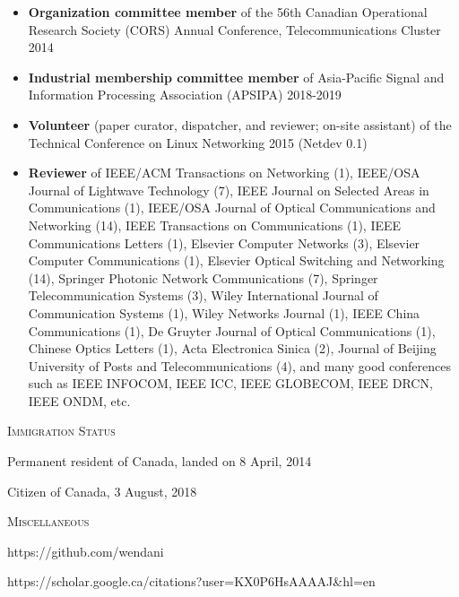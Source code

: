 \documentclass[letterpaper,11pt]{article}
\newcommand{\resheading}[1]{{\noindent\large \colorbox{mygrey}{
\begin{minipage}{1.0\textwidth}{\textsc{#1 \vphantom{p\^{E}}}}\end{minipage}}}}
\begin{document}
\begin{itemize}
\item
\textbf{Organization committee member} of the 56th Canadian Operational Research Society (CORS) Annual Conference, Telecommunications Cluster 2014

\item
\textbf{Industrial membership committee member} of Asia-Pacific Signal and Information Processing Association (APSIPA) 2018-2019

\item
\textbf{Volunteer} (paper curator, dispatcher, and reviewer; on-site assistant) of the Technical Conference on Linux Networking 2015 (Netdev 0.1)

\item
\textbf{Reviewer} of IEEE/ACM Transactions on Networking (1), IEEE/OSA Journal of Lightwave Technology (7), IEEE Journal on Selected Areas in Communications (1),
IEEE/OSA Journal of Optical Communications and Networking (14), IEEE Transactions on Communications (1), IEEE Communications Letters (1),
Elsevier Computer Networks (3), Elsevier Computer Communications (1), Elsevier Optical Switching and Networking (14),
Springer Photonic Network Communications (7), Springer Telecommunication Systems (3), Wiley International Journal of Communication Systems (1),
Wiley Networks Journal (1), IEEE China Communications (1), De Gruyter Journal of Optical Communications (1), Chinese Optics Letters (1),
Acta Electronica Sinica (2), Journal of Beijing University of Posts and Telecommunications (4),
and many good conferences such as IEEE INFOCOM, IEEE ICC, IEEE GLOBECOM, IEEE DRCN, IEEE ONDM, etc.

\end{itemize}




\resheading{Immigration Status}%
\vspace{0.15in} %

\leftskip 0.2in %

Permanent resident of Canada, landed on 8 April, 2014

Citizen of Canada, 3 August, 2018

\leftskip 0.0in




\vspace{0.1in}
\resheading{Miscellaneous}
\begin{description}
\setlength{\itemindent}{-0.1in}
\item[GitHub:] https://github.com/wendani

\item[Google Scholar:] https://scholar.google.ca/citations?user=KX0P6HsAAAAJ\&hl=en
\end{description}
\end{document}
